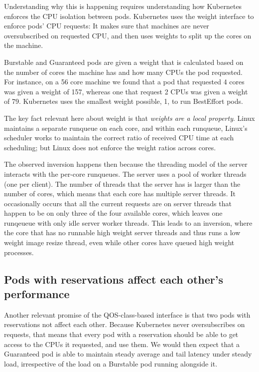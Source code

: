 Understanding why this is happening requires understanding how Kubernetes
enforces the CPU isolation between pods. Kubernetes uses the \cgroups{} weight
interface to enforce pods' CPU requests: It makes sure that machines are never
oversubscribed on requested CPU, and then uses weights to split up the cores on
the machine.

Burstable and Guaranteed pods are given a weight that is calculated based on the
number of cores the machine has and how many CPUs the pod requested. For
instance, on a 56 core machine we found that a pod that requested 4 cores was
given a weight of 157, whereas one that request 2 CPUs was given a weight of 79.
Kubernetes uses the smallest weight possible, 1, to run BestEffort pods.

The key fact relevant here about \cgroups{} weight is that \textit{weights are a
local property}. Linux maintains a separate runqueue on each core, and within
each runqueue, Linux's scheduler works to maintain the correct ratio of received
CPU time at each scheduling; but Linux does not enforce the weight ratios across
cores.

The observed inversion happens then because the threading model of the server
interacts with the per-core runqueues. The server uses a pool of worker threads
(one per client). The number of threads that the server has is larger than the
number of cores, which means that each core has multiple server threads. It
occasionally occurs that all the current requests are on server threads that
happen to be on only three of the four available cores, which leaves one
runqeueue with only idle server worker threads. This leads to an inversion,
where the core that has no runnable high weight server threads and thus runs a
low weight image resize thread, even while other cores have queued high weight
processes.


\subsection{Pods with reservations affect each other's performance}

Another relevant promise of the QOS-class-based interface is that two pods with
reservations not affect each other. Because Kubernetes never oversubscribes on
requests, that means that every pod with a reservation should be able to get
access to the CPUs it requested, and use them. We would then expect that a
Guaranteed pod is able to maintain steady average and tail latency under steady
load, irrespective of the load on a Burstable pod running alongside it.



